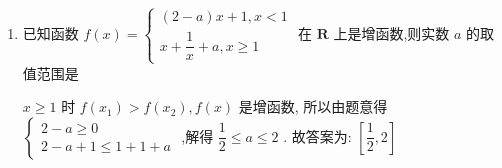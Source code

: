 \begin{enumerate}
\begin{enumerate}
\begin{jieda}
    \end{jieda}
    \item 已知函数 $f\left( x\right)  = \left\{  \begin{matrix} \left( {2 - a}\right) x + 1,x < 1 \\  x + \dfrac{1}{x} + a,x \geq  1 \end{matrix}\right.$ 在 $\mathbf{R}$ 上是增函数,则实数 $a$ 的取值范围是\blkda{$\left\lbrack  {\dfrac{1}{2},2}\right]$ }
    \begin{jieda}
        $x \geq  1$ 时 $f\left( {x}_{1}\right)  > f\left( {x}_{2}\right) ,f\left( x\right)$ 是增函数, 所以由题意得 $\left\{  \begin{matrix} 2 - a \geq 0 \\  2 - a + 1 \leq  1 + 1 + a \end{matrix}\right.$ ,解得 $\dfrac{1}{2} \leq  a \leq 2$ . 故答案为: $\left\lbrack  {\dfrac{1}{2},2}\right]$ 
    \end{jieda} 
\end{enumerate}


\end{enumerate}
